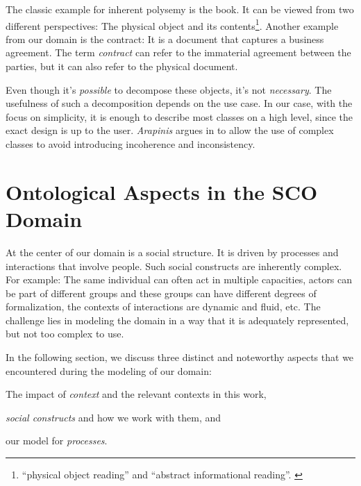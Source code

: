 \documentclass[a4paper, DIV=13, BCOR=0cm]{scrbook}
\begin{document}
The classic example for inherent polysemy is the book. It can be viewed from two different perspectives: The physical object and its contents\footnote{\enquote{physical object reading} and \enquote{abstract informational reading}. \cite[Section 2.1]{arapinis2015plea}}. Another example from our domain is the contract: It is a document that captures a business agreement. The term \textit{contract} can refer to the immaterial agreement between the parties, but it can also refer to the physical document.

Even though it's \textit{possible} to decompose these objects, it's not \textit{necessary}. The usefulness of such a decomposition depends on the use case. In our case, with the focus on simplicity, it is enough to describe most classes on a high level, since the exact design is up to the user. \textit{Arapinis} argues in \cite{arapinis2015plea} to allow the use of complex classes to avoid introducing incoherence and inconsistency.

\chapter[Ontological Aspects in the SCO Domain \\\textcolor{gray}{
	{\footnotesize \textsl{Discusses the three major concepts and their implementation in the context of related work.}}
}]{Ontological Aspects in the SCO Domain}
\label{domain-aspects}
At the center of our domain is a social structure. It is driven by processes and interactions that involve people. Such social constructs are inherently complex. For example: The same individual can often act in multiple capacities, actors can be part of different groups and these groups can have different degrees of formalization, the contexts of interactions are dynamic and fluid, etc. The challenge lies in modeling the domain in a way that it is adequately represented, but not too complex to use.

In the following section, we discuss three distinct and noteworthy aspects that we encountered during the modeling of our domain:
\begin{inparablank}
	\item The impact of \textit{context} and the relevant contexts in this work,
	\item \textit{social constructs} and how we work with them, and
	\item our model for \textit{processes}.
\end{inparablank}
\end{document}
